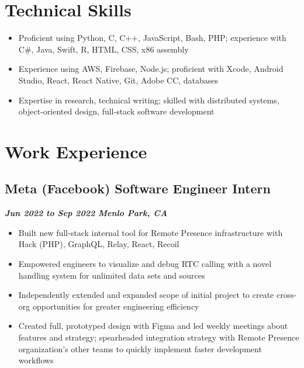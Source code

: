 \documentclass[10pt]{article}
\begin{document}
\begin{raggedright}
    \section*{Technical Skills}

        \begin{itemize}
            \item Proficient using Python, C, C++, JavaScript, Bash, PHP; experience with C\#, Java, Swift, R, HTML, CSS, x86 assembly
            \item Experience using AWS, Firebase, Node.js; proficient with Xcode, Android Studio, React, React Native, Git, Adobe CC, databases
            \item Expertise in research, technical writing; skilled with distributed systems, object-oriented design, full-stack software development
        \end{itemize}

    \section*{Work Experience}

	    \subsection*{\textbf{\large{Meta (Facebook) \textendash{} Software Engineer Intern}}} \hfill \textbf{\textit{Jun 2022 to Sep 2022 \textendash{} Menlo Park, CA}}
        \begin{itemize}
            \item Built new full-stack internal tool for Remote Presence infrastructure with Hack (PHP), GraphQL, Relay, React, Recoil
            \item Empowered engineers to visualize and debug RTC calling with a novel handling system for unlimited data sets and sources
            \item Independently extended and expanded scope of initial project to create cross-org opportunities for greater engineering efficiency
            \item Created full, prototyped design with Figma and led weekly meetings about features and strategy; spearheaded integration strategy with Remote Presence organization's other teams to quickly implement faster development workflows
        \end{itemize}


\end{raggedright}
\end{document}

